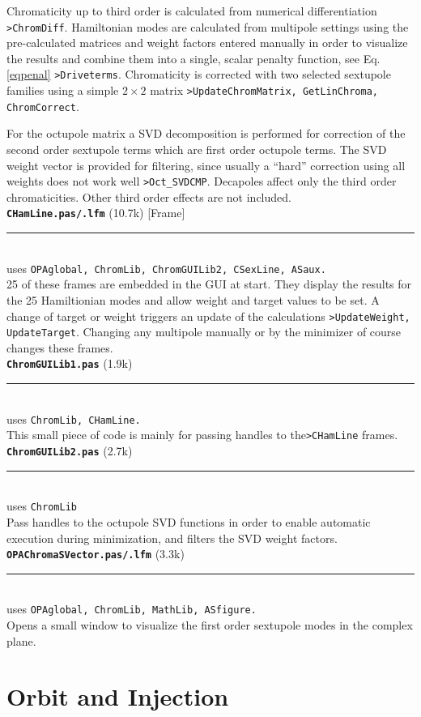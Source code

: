 \documentclass[12pt]{article}
\newcommand\code[1]{{\tt #1}}
\newcommand\opamodule[3]{{\bf \tt #1} #2\\  \rule[3pt]{\textwidth}{0.2pt} \\ {\scriptsize uses \tt  #3}\\[1ex]}
\begin{document}
Chromaticity up to third order is calculated from numerical differentiation \code{>ChromDiff}. Hamiltonian modes are calculated from multipole settings using the pre-calculated matrices and weight factors entered manually in order to visualize the results and combine them into a single, scalar penalty function, see Eq.\ref{eqpenal} \code{>Driveterms}. Chromaticity is corrected with two selected sextupole families using a simple $2\times 2$ matrix \code{>UpdateChromMatrix, GetLinChroma, ChromCorrect}.

For the octupole matrix a SVD decomposition is performed for correction of the second order sextupole terms which are first order octupole terms. The SVD weight vector is provided for filtering, since usually a ``hard'' correction using all weights does not work well \code{>Oct\_SVDCMP}.
Decapoles affect only the third order chromaticities. Other third order effects are not included.\\


\opamodule{CHamLine.pas/.lfm}{(10.7k) [Frame]}{OPAglobal, ChromLib, ChromGUILib2, CSexLine, ASaux.}
25 of these frames are embedded in the GUI at start. They display the results for the 25 Hamiltionian modes and allow weight and target values to be set. A change of target or weight triggers an update of the calculations \code{>UpdateWeight, UpdateTarget}. Changing any multipole manually or by the minimizer of course changes these frames.\\



\opamodule{ChromGUILib1.pas}{(1.9k)}{ChromLib, CHamLine.}
This small piece of code is mainly for passing handles to the\code{>CHamLine} frames.\\

\opamodule{ChromGUILib2.pas}{(2.7k)}{ChromLib}
Pass handles to the octupole SVD functions in order to enable automatic execution during minimization, and filters the SVD weight factors.\\


\opamodule{OPAChromaSVector.pas/.lfm}{(3.3k)}{OPAglobal, ChromLib, MathLib, ASfigure.}
Opens a small window to visualize the first order sextupole modes in the complex plane.









\section{\label{secorin}Orbit and Injection}
\end{document}
